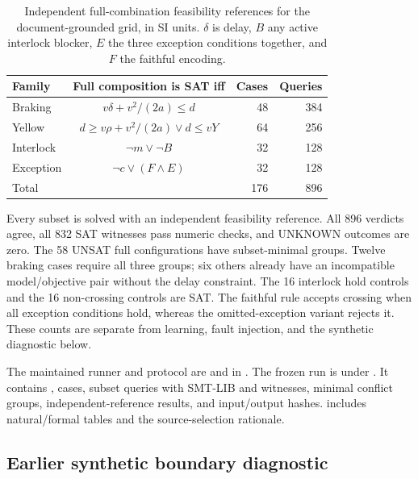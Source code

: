 \documentclass[10pt]{article}
\begin{document}
\begin{table}[h]
\centering\small
\caption{Independent full-combination feasibility references for the
document-grounded grid, in SI units. $\delta$ is delay, $B$ any active
interlock blocker, $E$ the three exception conditions together, and $F$ the
faithful encoding.}
\label{tab:sup-document-composition}
\begin{tabular}{lcrr}
\toprule
Family & Full composition is SAT iff & Cases & Queries\\
\midrule
Braking & $v\delta+v^2/(2a)\le d$ & 48 & 384\\
Yellow & $d\ge v\rho+v^2/(2a)\lor d\le vY$ & 64 & 256\\
Interlock & $\neg m\lor\neg B$ & 32 & 128\\
Exception & $\neg c\lor(F\land E)$ & 32 & 128\\
\midrule
Total & & 176 & 896\\
\bottomrule
\end{tabular}
\end{table}

Every subset is solved with an independent feasibility reference. All 896
verdicts agree, all 832 SAT witnesses pass numeric checks, and UNKNOWN
outcomes are zero. The 58 UNSAT full configurations have subset-minimal
groups. Twelve braking cases require all three groups; six others already
have an incompatible model/objective pair without the delay constraint.
The 16 interlock hold controls and the 16 non-crossing controls are SAT.
The faithful rule accepts crossing when all exception conditions hold,
whereas the omitted-exception variant rejects it. These counts are separate
from learning, fault injection, and the synthetic diagnostic below.

\begingroup\raggedright
The maintained runner and protocol are
 and
 in
.
The frozen run is
 under
.
It contains , cases, subset queries with SMT-LIB
and witnesses, minimal conflict groups, independent-reference results, and
input/output hashes.  includes natural/formal tables
and the source-selection rationale.
\par\endgroup

\subsection*{Earlier synthetic boundary diagnostic}
\end{document}
